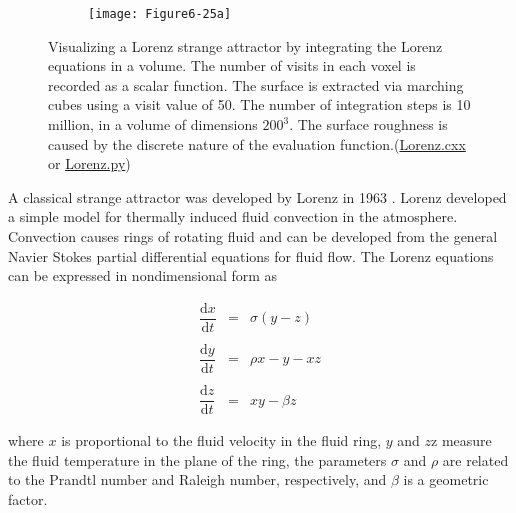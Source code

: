 \begin{figure}[htb]
	\begin{subfigure}[h]{0.48\linewidth}
		\texttt{[image: Figure6-25a]}
		\caption{}
		\label{fig:Figure6-25a}
	\end{subfigure}
	\hfill
	\begin{subfigure}[h]{0.48\linewidth}
		\caption{}
		\label{fig:Figure6-25b}
	\end{subfigure}
	\caption{Visualizing a Lorenz strange attractor by integrating the Lorenz equations in a volume. The number of visits in each voxel is recorded as a scalar function. The surface is extracted via marching cubes using a visit value of 50. The number of integration steps is 10 million, in a volume of dimensions $200^3$. The surface roughness is caused by the discrete nature of the evaluation function.(\href{https://lorensen.github.io/VTKExamples/site/Cxx/Visualization/Lorenz}{Lorenz.cxx} or \href{https://lorensen.github.io/VTKExamples/site/Python/Visualization/Lorenz/}{Lorenz.py})}\label{fig:Figure6-25}
\end{figure}

A classical strange attractor was developed by Lorenz in 1963 \cite{Lorenz63}. Lorenz developed a simple model for thermally induced fluid convection in the atmosphere. Convection causes rings of rotating fluid and can be developed from the general Navier Stokes partial differential equations for fluid flow. The Lorenz equations can be expressed in nondimensional form as

\begin{equation}\label{eq:6.16}
\begin{array}{lll}
\dfrac{\text{d}x}{\text{d}t} &=& \sigma (y - z) \\ \\
\dfrac{\text{d}y}{\text{d}t} &=& \rho x - y - x z \\ \\
\dfrac{\text{d}z}{\text{d}t} &=& x y - \beta z
\end{array}
\end{equation}

where $x$ is proportional to the fluid velocity in the fluid ring, $y$ and $z$z measure the fluid temperature in the plane of the ring, the parameters $\sigma$ and $\rho$ are related  to the Prandtl number and Raleigh number, respectively, and $\beta$ is a geometric factor.

